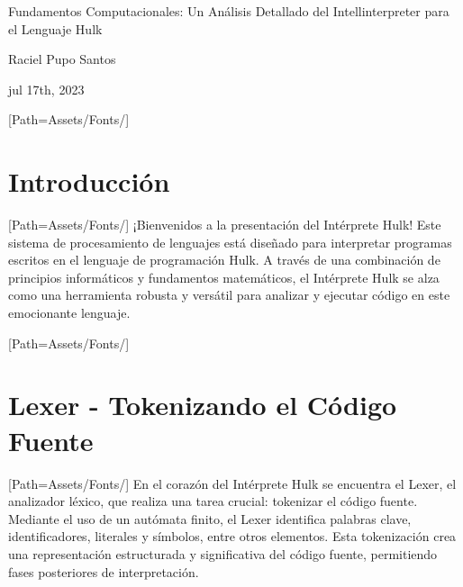 \documentclass{article}
\begin{document}
\begin{titlepage}

\begin{flushright}

\vspace{3cm}

\Huge Fundamentos Computacionales: Un Análisis Detallado del Intellinterpreter para el Lenguaje Hulk

\vspace{1.5cm}

\Large Raciel Pupo Santos 

\vspace{5cm}

\normalsize jul 17th, 2023

\end{flushright}

\end{titlepage}
\newpage
\tableofcontents
\newpage
\setmainfont{LEMONMILK-Bold.otf}[Path=Assets/Fonts/]
\section{Introducción}
    \setmainfont{LEMONMILK-Regular.otf}[Path=Assets/Fonts/]
    ¡Bienvenidos a la presentación del Intérprete Hulk! Este sistema de procesamiento de lenguajes está diseñado para interpretar programas escritos en el lenguaje de programación Hulk. A través de una combinación de principios informáticos y fundamentos matemáticos, el Intérprete Hulk se alza como una herramienta robusta y versátil para analizar y ejecutar código en este emocionante lenguaje.
\newpage

\setmainfont{LEMONMILK-Bold.otf}[Path=Assets/Fonts/]
\section{Lexer - Tokenizando el Código Fuente}
    \setmainfont{LEMONMILK-Regular.otf}[Path=Assets/Fonts/]
    En el corazón del Intérprete Hulk se encuentra el Lexer, el analizador léxico, que realiza una tarea crucial: tokenizar el código fuente. Mediante el uso de un autómata finito, el Lexer identifica palabras clave, identificadores, literales y símbolos, entre otros elementos. Esta tokenización crea una representación estructurada y significativa del código fuente, permitiendo fases posteriores de interpretación.
\newpage
\end{document}
